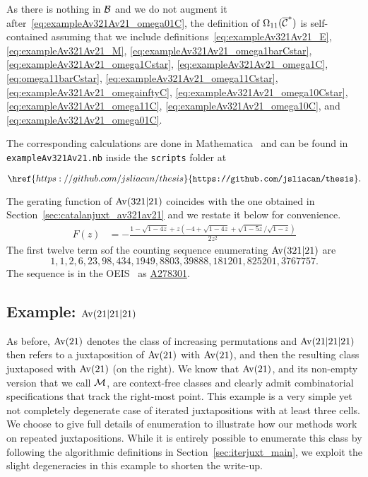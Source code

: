 \documentclass[12pt, a4paper, twoside]{report}
\begin{document}
As there is nothing in $\mathcal{B}$ and we do not augment it after~\eqref{eq:exampleAv321Av21_omega01C}, the definition of $\Omega_{11}(\overline{\mathcal{C}}^*)$ is self-contained assuming that we include definitions~\eqref{eq:exampleAv321Av21_E}, \eqref{eq:exampleAv321Av21_M}, \eqref{eq:exampleAv321Av21_omega1barCstar}, \eqref{eq:exampleAv321Av21_omega1Cstar}, \eqref{eq:exampleAv321Av21_omega1C}, \eqref{eq:omega11barCstar}, \eqref{eq:exampleAv321Av21_omega11Cstar}, \eqref{eq:exampleAv321Av21_omegainftyC}, \eqref{eq:exampleAv321Av21_omega10Cstar}, \eqref{eq:exampleAv321Av21_omega11C}, \eqref{eq:exampleAv321Av21_omega10C}, and \eqref{eq:exampleAv321Av21_omega01C}.

The corresponding calculations are done in Mathematica~\cite{mathematica} and can be found in \texttt{exampleAv321Av21.nb} inside the \texttt{scripts} folder at

$$\href{https://github.com/jsliacan/thesis}{\texttt{https://github.com/jsliacan/thesis}}.$$

The gerating function of $\mathrm{Av}(321|21)$ coincides with the one obtained in Section~\ref{sec:catalanjuxt_av321av21} and we restate it below for convenience.
\begin{align*}
  F(z) &= -\frac{1-\sqrt{1-4z} + z(-4+\sqrt{1-4z} + \sqrt{1-5z}/\sqrt{1-z})}{2z^2}
\end{align*}
The first twelve term sof the counting sequence enumerating $\mathrm{Av}(321|21)$ are
$$1,1,2,6,23,98,434,1949,8803,39888,181201,825201,3767757.$$
The sequence is in the OEIS~\cite{oeis} as \href{https://oeis.org/A278301}{A278301}.
\subsection{Example: $\mathrm{Av}(21|21|21)$}
\label{sec:example_mmm}
As before, $\mathrm{Av}(21)$ denotes the class of increasing permutations and $\mathrm{Av}(21|21|21)$ then refers to a juxtaposition of $\mathrm{Av}(21)$ with $\mathrm{Av}(21)$, and then the resulting class juxtaposed with $\mathrm{Av}(21)$ (on the right). We know that $\mathrm{Av}(21)$, and its non-empty version that we call $\mathcal{M}$, are context-free classes and clearly admit combinatorial specifications that track the right-most point. This example is a very simple yet not completely degenerate case of iterated juxtapositions with at least three cells. We choose to give full details of enumeration to illustrate how our methods work on repeated juxtapositions. While it is entirely possible to enumerate this class by following the algorithmic definitions in Section~\ref{sec:iterjuxt_main}, we exploit the slight degeneracies in this example to shorten the write-up.
\end{document}
